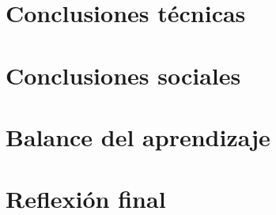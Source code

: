 \section{Conclusiones técnicas}
    
\section{Conclusiones sociales}
    
\section{Balance del aprendizaje}
    
\section{Reflexión final}
    
